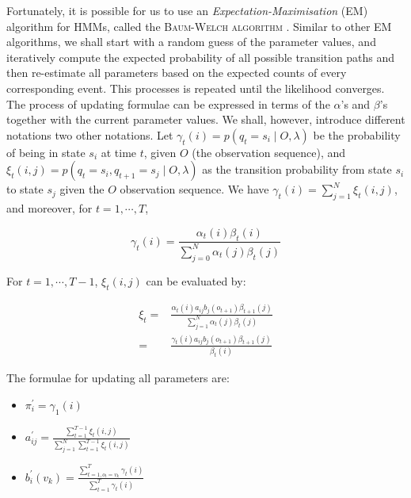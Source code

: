 Fortunately, it is possible for us to use an \textit{Expectation-Maximisation} (EM) algorithm for HMMs, called the \textsc{Baum-Welch algorithm} \cite{dugad1996tutorial}. Similar to other 	EM algorithms, we shall start with a random guess of the parameter values, and iteratively compute the expected probability of all possible transition paths and then re-estimate all parameters based on the expected counts of every corresponding event. This processes is repeated until the likelihood converges. \\

The process of updating formulae can be expressed in terms of the $\alpha$'s and $\beta$'s together with the current parameter values. We shall, however, introduce different notations two other notations. Let $\gamma_{t}(i) = p(q_t = s_i \mid O, \lambda)$ be the probability of being in state $s_i$ at time $t$, given $O$ (the observation sequence), and $\xi_{t}(i,j) = p(q_t = s_i, q_{t+1} = s_j \mid O, \lambda)$ as the transition probability from state $s_i$ to state $s_j$ given the $O$ observation sequence. We have $\gamma_{t}(i) = \sum\limits_{j=1}^{N} \xi_{t} (i,j)$, and moreover, for $t = 1, \cdots, T$,

\begin{equation}
	\gamma_{t}(i) = \frac{\alpha_{t}(i) \beta_{t}(i)}{\sum\limits_{j=0}^{N} \alpha_{t}(j) \beta_{t}(j)}
\end{equation}

For $t = 1, \cdots, T - 1$, $\xi_{t}(i,j)$ can be evaluated by:

\begin{equation}
\begin{aligned}
\xi_{t} ={} & \frac{\alpha_{t}(i) a_{ij} b_{j} (o_{t+1}) \beta_{t+1}(j)}{\sum\limits_{j=1}^{N} \alpha_{t}(j) \beta_{t}(j)} \\[2mm]
           ={} & \frac{\gamma_{t}(i) a_{ij} b_{j} (o_{t+1}) \beta_{t+1}(j)}{\beta_{t}(i)}
\end{aligned}
\end{equation}

The formulae for updating all parameters are:

\begin{itemize}
	\item{$\pi^{'}_{i} = \gamma_{1}(i)$}
	\item{$a^{'}_{ij} = \frac{\sum\limits_{t=1}^{T-1} \xi_{t}(i,j)}{\sum\limits_{j=1}^{N} \sum\limits_{t=1}^{T-1} \xi_{t}(i,j)}$}
	\item{$b^{'}_{i}(v_{k}) = \frac{\sum\limits_{t=1, o_{t} = v_{k}}^{T} \gamma_{t}(i)}{\sum\limits_{t=1}^{T} \gamma_{t}(i)}$}
\end{itemize}

